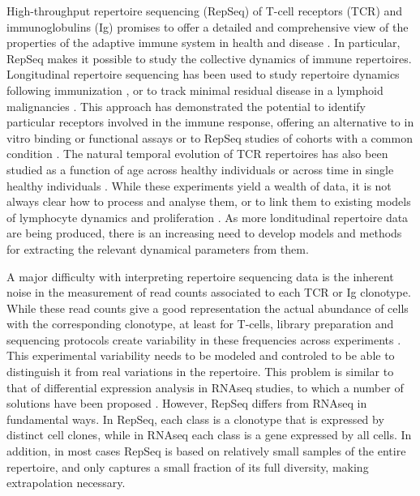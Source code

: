 \documentclass[pre,twocolumn,english,longbibliography]{revtex4}
\newcommand{\<}{\langle}
\renewcommand{\>}{\rangle}
\begin{document}
High-throughput repertoire sequencing (RepSeq) of T-cell receptors (TCR) and immunoglobulins (Ig) promises to offer a detailed and comprehensive view of the properties of the adaptive immune system in health and disease \cite{Benichou2011,Georgiou2014a,Robins2013a,Calis2014a}.
In particular, RepSeq makes it possible to study the collective dynamics of immune repertoires.
Longitudinal repertoire sequencing has been used to study repertoire dynamics following immunization \cite{Vollmers2013,Jiang2013a,Parameswaran2013,Thomas2014b,Laserson2014,Wang2015,Qi2016,Pogorelyy2018c,Horns2019}, or to track minimal residual disease in a lymphoid malignancies \cite{Logan2011}. This approach has demonstrated the potential to identify particular receptors involved in the immune response, offering an alternative to in vitro binding or functional assays \cite{Dash2017,Glanville2017} or to RepSeq studies of cohorts with a common condition \cite{Emerson2017}.
The natural temporal evolution of TCR repertoires has also been studied as a function of age across healthy individuals \cite{Britanova2016} or across time in single healthy individuals \cite{Chu2019}. While these experiments yield a wealth of data, it is not always clear how to process and analyse them, or to link them to existing models of lymphocyte dynamics and proliferation \cite{Chao2004,Zilman2010,DeBoer:2013p13069,Desponds2016}.
As more londitudinal repertoire data are being produced, there is an increasing need to develop models and methods for extracting the relevant dynamical parameters from them.

A major difficulty with interpreting repertoire sequencing data is the inherent noise in the measurement of read counts associated to each TCR or Ig clonotype. While these read counts give a good representation the actual abundance of cells with the corresponding clonotype, at least for T-cells, library preparation and sequencing protocols create variability in these frequencies across experiments \cite{Robins2012a}. This experimental variability needs to be modeled and controled to be able to distinguish it from real variations in the repertoire. This problem is similar to that of differential expression analysis in RNAseq studies, to which a number of solutions have been proposed \cite{Robinson2008,Robinson2010,Anders2010,Love2014}. However, RepSeq differs from RNAseq in fundamental ways. In RepSeq, each class is a clonotype that is expressed by distinct cell clones, while in RNAseq each class is a gene expressed by all cells.
In addition, in most cases RepSeq is based on relatively small samples of the entire repertoire, and only captures a small fraction of its full diversity, making extrapolation necessary.
\end{document}
